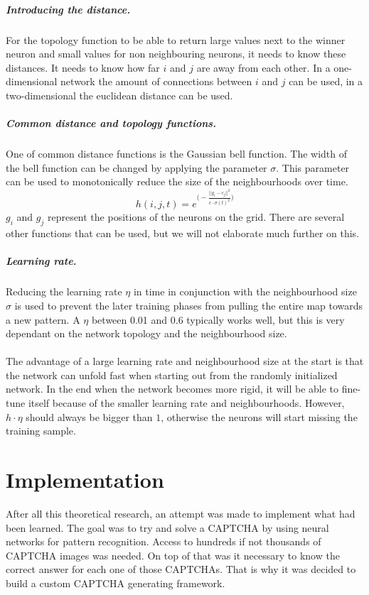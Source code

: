 \documentclass[pdftex,a4paper,12pt,twoside]{report}
\theoremstyle{plain} \newtheorem{theorem}{Theorem} \newtheorem{proposition}{Proposition} \newtheorem{lemma}{Lemma} \newtheorem*{corollary}{Corollary}
\theoremstyle{definition} \newtheorem{definition}{Definition} \newtheorem{conjecture}{Conjecture} \newtheorem*{example}{Example} \newtheorem{algorithm}{Algorithm}
\theoremstyle{remark} \newtheorem*{remark}{Remark} \newtheorem*{note}{Note} \newtheorem{case}{Case}
\begin{document}
\subparagraph{Introducing the distance.}
For the topology function to be able to return large values next to the winner neuron and small values for non neighbouring neurons, it needs to know these distances. It needs to know how far $i$ and $j$ are away from each other. In a one-dimensional network the amount of connections between $i$ and $j$ can be used, in a two-dimensional the euclidean distance can be used.
\subparagraph{Common distance and topology functions.}
One of common distance functions is the Gaussian bell function. The width of the bell function can be changed by applying the parameter $\sigma$. This parameter can be used to monotonically reduce the size of the neighbourhoods over time.
\begin{equation}
h(i,j,t) = e^{ \big( - \frac{||g_i-c_j||^2}{e \cdot \sigma (t)^2} \big) }
\end{equation}
$g_i$ and $g_j$ represent the positions of the neurons on the grid. There are several other functions that can be used, but we will not elaborate much further on this.
\subparagraph{Learning rate.}
Reducing the learning rate $\eta$ in time in conjunction with the neighbourhood size $\sigma$ is used to prevent the later training phases from pulling the entire map towards a new pattern. A $\eta$ between 0.01 and 0.6 typically works well, but this is very dependant on the network topology and the neighbourhood size.\\\\The advantage of a large learning rate and neighbourhood size at the start is that the network can unfold fast when starting out from the randomly initialized network. In the end when the network becomes more rigid, it will be able to fine-tune itself because of the smaller learning rate and neighbourhoods. However, $h \cdot \eta$ should always be bigger than $1$, otherwise the neurons will start missing the training sample.
\section{Implementation}
\label{sec:implementation}
After all this theoretical research, an attempt was made to implement what had been learned. The goal was to try and solve a CAPTCHA by using neural networks for pattern recognition. Access to hundreds if not thousands of CAPTCHA images was needed. On top of that was it necessary to know the correct answer for each one of those CAPTCHAs. That is why it was decided to build a custom CAPTCHA generating framework.
\end{document}
